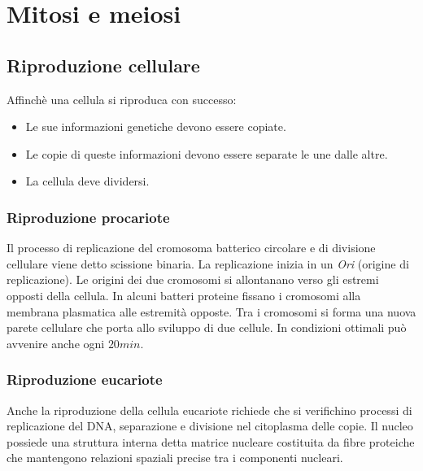 \chapter{Mitosi e meiosi}
\section{Riproduzione cellulare}
Affinch\`e una cellula si riproduca con successo:
\begin{itemize}
	\item Le sue informazioni genetiche devono essere copiate.
	\item Le copie di queste informazioni devono essere separate le une dalle altre.
	\item La cellula deve dividersi.
\end{itemize}
\subsection{Riproduzione procariote}
Il processo di replicazione del cromosoma batterico circolare e di divisione cellulare viene detto scissione binaria. La replicazione inizia in un \emph{Ori} (origine di replicazione). Le origini dei 
due cromosomi si allontanano verso gli estremi opposti della cellula. In alcuni batteri proteine fissano i cromosomi alla membrana plasmatica alle estremit\`a opposte. Tra i cromosomi si forma una 
nuova parete cellulare che porta allo sviluppo di due cellule. In condizioni ottimali pu\`o avvenire anche ogni $20min$.
\subsection{Riproduzione eucariote}
Anche la riproduzione della cellula eucariote richiede che si verifichino processi di replicazione del DNA, separazione e divisione nel citoplasma delle copie. Il nucleo possiede una struttura interna 
detta matrice nucleare costituita da fibre proteiche che mantengono relazioni spaziali precise tra i componenti nucleari. 
